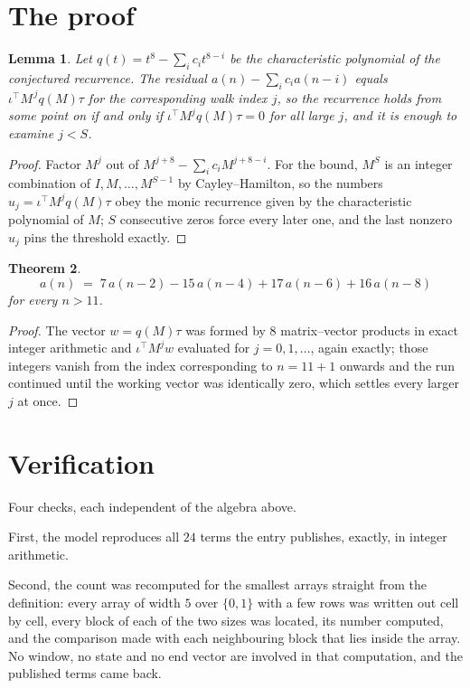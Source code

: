 \documentclass[11pt,a4paper]{article}
\theoremstyle{plain}
\newtheorem{theorem}{Theorem}
\newtheorem{lemma}[theorem]{Lemma}
\theoremstyle{definition}
\begin{document}
\section{The proof}

\begin{lemma}\label{lem:crit}
Let $q(t)=t^{8}-\sum_i c_it^{8-i}$ be the characteristic polynomial of the
conjectured recurrence. The residual $a(n)-\sum_ic_ia(n-i)$ equals
$\iota^{\!\top}M^{\,j}q(M)\tau$ for the corresponding walk index $j$, so the recurrence
holds from some point on if and only if $\iota^{\!\top}M^{j}q(M)\tau=0$ for all large $j$,
and it is enough to examine $j<S$.
\end{lemma}

\begin{proof}
Factor $M^{j}$ out of $M^{j+8}-\sum_ic_iM^{j+8-i}$. For the bound, $M^{S}$
is an integer combination of $I,M,\dots,M^{S-1}$ by Cayley--Hamilton, so the numbers
$u_j=\iota^{\!\top}M^{j}q(M)\tau$ obey the monic recurrence given by the characteristic
polynomial of $M$; $S$ consecutive zeros force every later one, and the last nonzero $u_j$
pins the threshold exactly.
\end{proof}

\begin{theorem}
\[
a(n)\;=\;7\,a(n-2) - 15\,a(n-4) + 17\,a(n-6) + 16\,a(n-8)
\]
for every $n>11$.
\end{theorem}

\begin{proof}
The vector $w=q(M)\tau$ was formed by $8$ matrix--vector products in exact integer
arithmetic and $\iota^{\!\top}M^{j}w$ evaluated for $j=0,1,\dots$, again exactly; those
integers vanish from the index corresponding to $n=11+1$ onwards and the run continued
until the working vector was identically zero, which settles every larger $j$ at once.
\end{proof}

\section{Verification}

Four checks, each independent of the algebra above.

First, the model reproduces all $24$ terms the entry publishes, exactly, in integer
arithmetic.

Second, the count was recomputed for the smallest arrays straight from the definition: every
array of width $5$ over $\{0,1\}$ with a few rows was written out cell by cell, every block of
each of the two sizes was located, its number computed, and the comparison made with each neighbouring block
that lies inside the array. No window, no state and no end vector are involved in that
computation, and the published terms came back.
\end{document}
